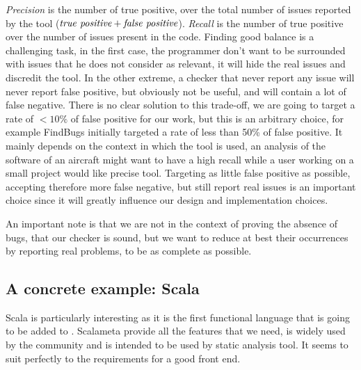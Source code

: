 \emph{Precision} is the number of true positive, over the total number of issues reported by the tool ($ \emph{true positive} + \emph{false positive} $). \emph{Recall} is the number of true positive over the number of issues present in the code. Finding good balance is a challenging task, in the first case, the programmer don’t want to be surrounded with issues that he does not consider as relevant, it will hide the real issues and discredit the tool. In the other extreme, a checker that never report any issue will never report false positive, but obviously not be useful, and will contain a lot of false negative. There is no clear solution to this trade-off, we are going to target a rate of $<10\%$ of false positive for our work, but this is an arbitrary choice, for example FindBugs \cite{Hovemeyer:2004:FBE:1052883.1052895} initially targeted a rate of less than 50\% of false positive. It mainly depends on the context in which the tool is used, an analysis of the software of an aircraft might want to have a high recall while a user working on a small project would like precise tool. Targeting as little false positive as possible, accepting therefore more false negative, but still report real issues is an important choice since it will greatly influence our design and implementation choices.

An important note is that we are not in the context of proving the absence of bugs, that our checker is sound, but we want to reduce at best their occurrences by reporting real problems, to be as complete as possible.

\subsection{A concrete example: Scala}
\label{subsec:concrete_example}

Scala is particularly interesting as it is the first functional language that is going to be added to \slang{}.
Scalameta \cite{Scalameta:2019:Online} provide all the features that we need, is widely used by the community and is intended to be used by static analysis tool. 
It seems to suit perfectly to the requirements for a good front end.

